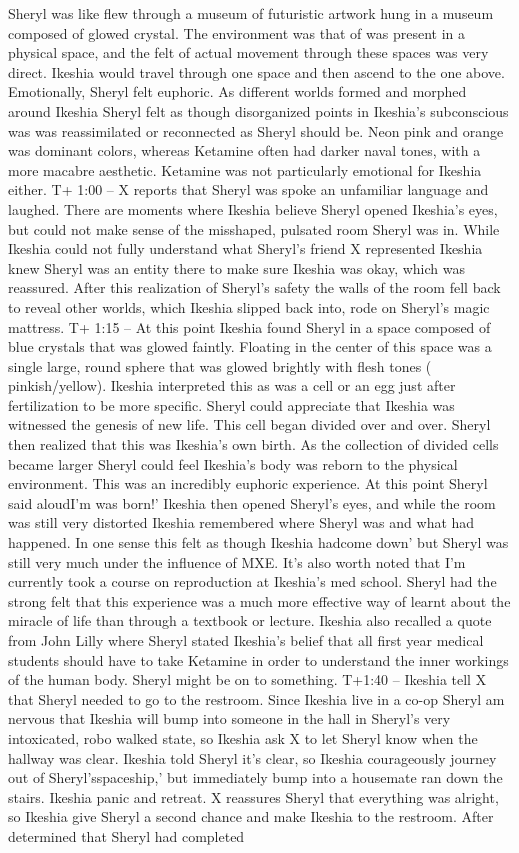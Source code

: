 \documentclass[12pt]{book}
\begin{document}
Sheryl was like flew through a museum of futuristic artwork hung in a museum composed of glowed crystal. The environment was that of was present in a physical space, and the felt of actual movement through these spaces was very direct. Ikeshia would travel through one space and then ascend to the one above. Emotionally, Sheryl felt euphoric. As different worlds formed and morphed around Ikeshia Sheryl felt as though disorganized points in Ikeshia's subconscious was was reassimilated or reconnected as Sheryl should be. Neon pink and orange was dominant colors, whereas Ketamine often had darker naval tones, with a more macabre aesthetic. Ketamine was not particularly emotional for Ikeshia either. T+ 1:00 -- X reports that Sheryl was spoke an unfamiliar language and laughed. There are moments where Ikeshia believe Sheryl opened Ikeshia's eyes, but could not make sense of the misshaped, pulsated room Sheryl was in. While Ikeshia could not fully understand what Sheryl's friend X represented Ikeshia knew Sheryl was an entity there to make sure Ikeshia was okay, which was reassured. After this realization of Sheryl's safety the walls of the room fell back to reveal other worlds, which Ikeshia slipped back into, rode on Sheryl's magic mattress. T+ 1:15 -- At this point Ikeshia found Sheryl in a space composed of blue crystals that was glowed faintly. Floating in the center of this space was a single large, round sphere that was glowed brightly with flesh tones ( pinkish/yellow). Ikeshia interpreted this as was a cell or an egg just after fertilization to be more specific. Sheryl could appreciate that Ikeshia was witnessed the genesis of new life. This cell began divided over and over. Sheryl then realized that this was Ikeshia's own birth. As the collection of divided cells became larger Sheryl could feel Ikeshia's body was reborn to the physical environment. This was an incredibly euphoric experience. At this point Sheryl said aloudI'm was born!' Ikeshia then opened Sheryl's eyes, and while the room was still very distorted Ikeshia remembered where Sheryl was and what had happened. In one sense this felt as though Ikeshia hadcome down' but Sheryl was still very much under the influence of MXE. It's also worth noted that I'm currently took a course on reproduction at Ikeshia's med school. Sheryl had the strong felt that this experience was a much more effective way of learnt about the miracle of life than through a textbook or lecture. Ikeshia also recalled a quote from John Lilly where Sheryl stated Ikeshia's belief that all first year medical students should have to take Ketamine in order to understand the inner workings of the human body. Sheryl might be on to something. T+1:40 -- Ikeshia tell X that Sheryl needed to go to the restroom. Since Ikeshia live in a co-op Sheryl am nervous that Ikeshia will bump into someone in the hall in Sheryl's very intoxicated, robo walked state, so Ikeshia ask X to let Sheryl know when the hallway was clear. Ikeshia told Sheryl it's clear, so Ikeshia courageously journey out of Sheryl'sspaceship,' but immediately bump into a housemate ran down the stairs. Ikeshia panic and retreat. X reassures Sheryl that everything was alright, so Ikeshia give Sheryl a second chance and make Ikeshia to the restroom. After determined that Sheryl had completed 
\end{document}
